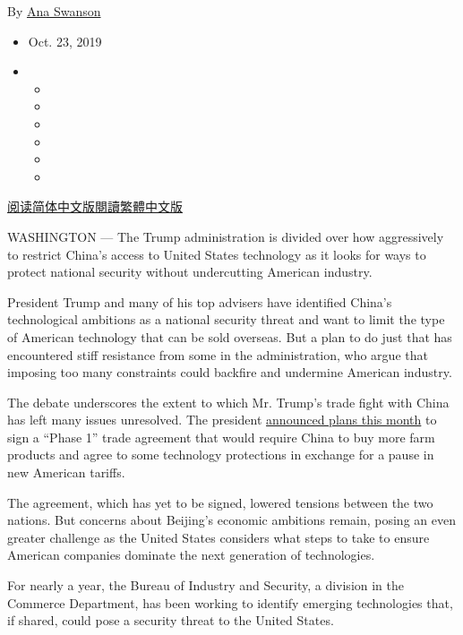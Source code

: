 By \href{https://www.nytimes.com/by/ana-swanson}{Ana Swanson}

\begin{itemize}
\item
  Oct. 23, 2019
\item
  \begin{itemize}
  \item
  \item
  \item
  \item
  \item
  \item
  \end{itemize}
\end{itemize}

\href{https://cn.nytimes.com/business/20191024/trump-technology-china-trade/}{阅读简体中文版}\href{https://cn.nytimes.com/business/20191024/trump-technology-china-trade/zh-hant/}{閱讀繁體中文版}

WASHINGTON --- The Trump administration is divided over how aggressively
to restrict China's access to United States technology as it looks for
ways to protect national security without undercutting American
industry.

President Trump and many of his top advisers have identified China's
technological ambitions as a national security threat and want to limit
the type of American technology that can be sold overseas. But a plan to
do just that has encountered stiff resistance from some in the
administration, who argue that imposing too many constraints could
backfire and undermine American industry.

The debate underscores the extent to which Mr. Trump's trade fight with
China has left many issues unresolved. The president
\href{https://www.nytimes.com/2019/10/11/business/economy/us-china-trade-deal.html}{announced
plans this month} to sign a ``Phase 1'' trade agreement that would
require China to buy more farm products and agree to some technology
protections in exchange for a pause in new American tariffs.

The agreement, which has yet to be signed, lowered tensions between the
two nations. But concerns about Beijing's economic ambitions remain,
posing an even greater challenge as the United States considers what
steps to take to ensure American companies dominate the next generation
of technologies.

For nearly a year, the Bureau of Industry and Security, a division in
the Commerce Department, has been working to identify emerging
technologies that, if shared, could pose a security threat to the United
States.

